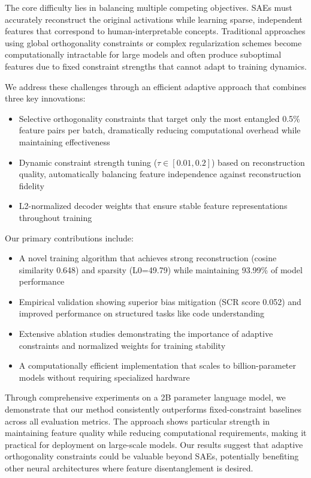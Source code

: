 \documentclass{article} %
\begin{document}
The core difficulty lies in balancing multiple competing objectives. SAEs must accurately reconstruct the original activations while learning sparse, independent features that correspond to human-interpretable concepts. Traditional approaches using global orthogonality constraints \cite{Bansal2018CanWG} or complex regularization schemes \cite{Cao2020HeteroskedasticAI} become computationally intractable for large models and often produce suboptimal features due to fixed constraint strengths that cannot adapt to training dynamics.

We address these challenges through an efficient adaptive approach that combines three key innovations:
\begin{itemize}
    \item Selective orthogonality constraints that target only the most entangled 0.5\% feature pairs per batch, dramatically reducing computational overhead while maintaining effectiveness
    \item Dynamic constraint strength tuning ($\tau \in [0.01, 0.2]$) based on reconstruction quality, automatically balancing feature independence against reconstruction fidelity
    \item L2-normalized decoder weights that ensure stable feature representations throughout training
\end{itemize}

Our primary contributions include:
\begin{itemize}
    \item A novel training algorithm that achieves strong reconstruction (cosine similarity 0.648) and sparsity (L0=49.79) while maintaining 93.99\% of model performance
    \item Empirical validation showing superior bias mitigation (SCR score 0.052) and improved performance on structured tasks like code understanding
    \item Extensive ablation studies demonstrating the importance of adaptive constraints and normalized weights for training stability
    \item A computationally efficient implementation that scales to billion-parameter models without requiring specialized hardware
\end{itemize}

Through comprehensive experiments on a 2B parameter language model, we demonstrate that our method consistently outperforms fixed-constraint baselines across all evaluation metrics. The approach shows particular strength in maintaining feature quality while reducing computational requirements, making it practical for deployment on large-scale models. Our results suggest that adaptive orthogonality constraints could be valuable beyond SAEs, potentially benefiting other neural architectures where feature disentanglement is desired.
\end{document}
